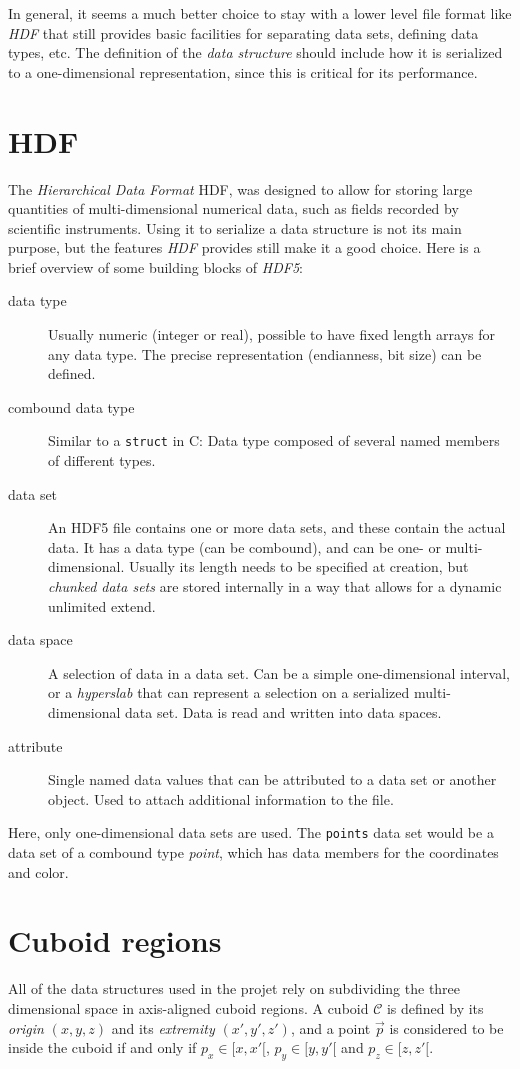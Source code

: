 \documentclass[a4paper,10pt,abstracton,notitlepage]{scrreprt}
\begin{document}
In general, it seems a much better choice to stay with a lower level file format like \emph{HDF} that still provides basic facilities for separating data sets, defining data types, etc. The definition of the \emph{data structure} should include how it is serialized to a one-dimensional representation, since this is critical for its performance.

\section{HDF}
The \emph{Hierarchical Data Format} HDF, was designed to allow for storing large quantities of multi-dimensional numerical data, such as fields recorded by scientific instruments. Using it to serialize a data structure is not its main purpose, but the features \emph{HDF} provides still make it a good choice. Here is a brief overview of some building blocks of \emph{HDF5}:
\begin{description}
\item[data type] Usually numeric (integer or real), possible to have fixed length arrays for any data type. The precise representation (endianness, bit size) can be defined.
\item[combound data type] Similar to a \texttt{struct} in C: Data type composed of several named members of different types.
\item[data set] An HDF5 file contains one or more data sets, and these contain the actual data. It has a data type (can be combound), and can be one- or multi-dimensional. Usually its length needs to be specified at creation, but \emph{chunked data sets} are stored internally in a way that allows for a dynamic unlimited extend.
\item[data space] A selection of data in a data set. Can be a simple one-dimensional interval, or a \emph{hyperslab} that can represent a selection on a serialized multi-dimensional data set. Data is read and written into data spaces.
\item[attribute] Single named data values that can be attributed to a data set or another object. Used to attach additional information to the file.
\end{description}
Here, only one-dimensional data sets are used. The \texttt{points} data set would be a data set of a combound type \emph{point}, which has data members for the coordinates and color.

\section{Cuboid regions} \label{sec:cub_reg}
All of the data structures used in the projet rely on subdividing the three dimensional space in axis-aligned cuboid regions. A cuboid $\mathcal{C}$ is defined by its \emph{origin} $(x, y, z)$ and its \emph{extremity} $(x', y', z')$, and a point $\overrightarrow{p}$ is considered to be inside the cuboid if and only if $p_{x} \in [x, x'[$, $p_{y} \in [y, y'[$ and $p_{z} \in [z, z'[$.
\end{document}
